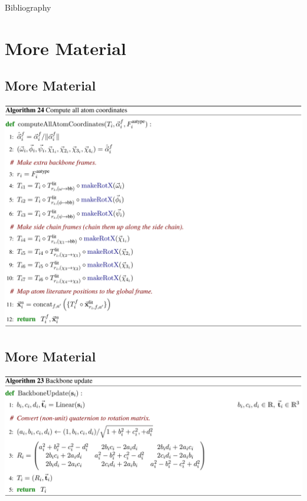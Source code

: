 \documentclass[presentation, smaller]{beamer}
\begin{document}
\begin{frame}[fragile,allowframebreaks,label=]{Bibliography}
  \printbibliography
\end{frame}


\section*{More Material}
\label{sec:orge0fd510}


\subsection*{More Material}
\label{sec:org9d67a90}
\begin{center}
  \includegraphics[width=.9\linewidth]{./imgs/all-atom-coords-algo.png}
\end{center}
\subsection*{More Material}
\begin{center}
\includegraphics[width=.9\linewidth]{./imgs/backbone-update-algo.png}
\end{center}
\end{document}

